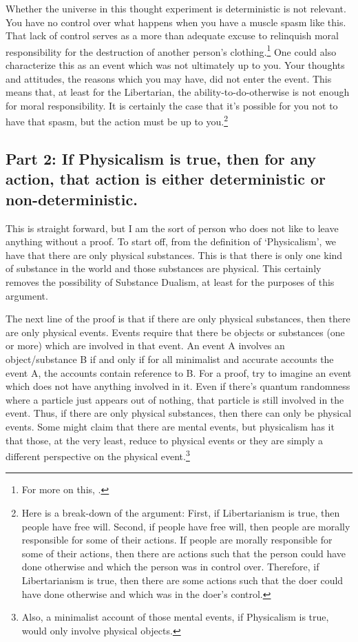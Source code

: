 Whether the universe in this thought experiment is deterministic is not relevant. You have no control over what happens when you have a muscle spasm like this. That lack of control serves as a more than adequate excuse to relinquish moral responsibility for the destruction of another person's clothing.\footnote{For more on this, \cite[see][ ]{Austin1}.} One could also characterize this as an event which was not ultimately up to you. Your thoughts and attitudes, the reasons which you may have, did not enter the event. This means that, at least for the Libertarian, the ability-to-do-otherwise is not enough for moral responsibility. It is certainly the case that it’s possible for you not to have that spasm, but the action must be up to you.\footnote{Here is a break-down of the argument: First, if Libertarianism is true, then people have free will. Second, if people have free will, then people are morally responsible for some of their actions. If people are morally responsible for some of their actions, then there are actions such that the person could have done otherwise and which the person was in control over. Therefore, if Libertarianism is true, then there are some actions such that the doer could have done otherwise and which was in the doer’s control.}
\subsection{Part 2: If Physicalism is true, then for any action, that action is either deterministic or non-deterministic.}

This is straight forward, but I am the sort of person who does not like to leave anything without a proof. To start off, from the definition of ‘Physicalism', we have that there are only physical substances. This is that there is only one kind of substance in the world and those substances are physical. This certainly removes the possibility of Substance Dualism, at least for the purposes of this argument.

The next line of the proof is that if there are only physical substances, then there are only physical events. Events require that there be objects or substances (one or more) which are involved in that event. An event A involves an object/substance B if and only if for all minimalist and accurate accounts the event A, the accounts contain reference to B. For a proof, try to imagine an event which does not have anything involved in it. Even if there’s quantum randomness where a particle just appears out of nothing, that particle is still involved in the event. Thus, if there are only physical substances, then there can only be physical events. Some might claim that there are mental events, but physicalism has it that those, at the very least, reduce to physical events or they are simply a different perspective on the physical event.\footnote{Also, a minimalist account of those mental events, if Physicalism is true, would only involve physical objects.}

